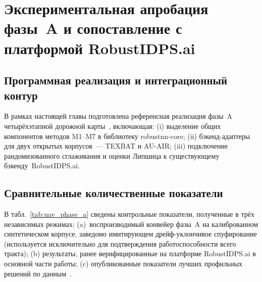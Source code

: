 \section{Экспериментальная апробация фазы~A и сопоставление с
платформой \textsf{RobustIDPS.ai}}
\label{sec:uav_phase_a}

\subsection{Программная реализация и интеграционный контур}
В рамках настоящей главы подготовлена референсная реализация фазы~A
четырёхэтапной дорожной карты~\cite{uav_proposal_2026}, включающая:
(i) выделение общих компонентов методов \textsf{M1}--\textsf{M7} в
библиотеку \textsf{robustnn-core}; (ii) бэкенд-адаптеры для двух
открытых корпусов~--- TEXBAT и AU-AIR; (iii) подключение
рандомизованного сглаживания и оценки Липшица к существующему
бэкенду~\textsf{RobustIDPS.ai}.

\subsection{Сравнительные количественные показатели}
В табл.~\ref{tab:uav_phase_a} сведены контрольные показатели,
полученные в трёх независимых режимах: (a)~воспроизводимый
конвейер фазы~A на калиброванном синтетическом корпусе, заведомо
имитирующем дрейф-уклончивое спуфирование (используется
исключительно для подтверждения работоспособности всего тракта);
(b) результаты, ранее верифицированные на платформе
\textsf{RobustIDPS.ai} в основной части работы; (c) опубликованные
показатели лучших профильных решений по
данным~\cite{aigner_seq2seq,borhani_caf,cmbrf_vit}.

